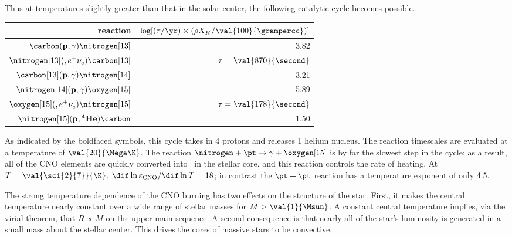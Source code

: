 Thus at temperatures slightly greater than that in the solar center, the following catalytic cycle becomes possible.
\begin{center}
\begin{tabular}{rr}
reaction & $\log[(\tau/\yr) \times (\rho X_{H}/\val{100}{\grampercc})]$\\
\hline
$\carbon(\mathbf{p},\gamma)\nitrogen[13]$ & 3.82\\
$\nitrogen[13](,e^{+}\nu_{e})\carbon[13]$ & $\tau=\val{870}{\second}$\\
$\carbon[13](\mathbf{p},\gamma)\nitrogen[14]$ & 3.21\\
$\nitrogen[14](\mathbf{p},\gamma)\oxygen[15]$ & 5.89 \\
$\oxygen[15](,e^{+}\nu_{e})\nitrogen[15]$ & $\tau = \val{178}{\second}$\\
$\nitrogen[15](\mathbf{p},\mathbf{^4He})\carbon$ & 1.50 \\
\hline
\end{tabular}
\end{center}
As indicated by the boldfaced symbols, this cycle takes in 4 protons and releases 1 helium nucleus.
The reaction timescales are evaluated at a temperature of $\val{20}{\Mega\K}$.
The reaction $\nitrogen+\pt\to\gamma+\oxygen[15]$ is by far the slowest step in the cycle; as a result, all of the CNO elements are quickly converted into \nitrogen\ in the stellar core, and this reaction controls the rate of heating.  At $T = \val{\sci{2}{7}}{\K}$, $\dif \ln \varepsilon_{\mathrm{CNO}}/\dif\ln T = 18$; in contrast the $\pt+\pt$ reaction has a temperature exponent of only 4.5.

The strong temperature dependence of the CNO burning has two effects on the structure of the star.  First, it makes the central temperature nearly constant over a wide range of stellar masses for $M > \val{1}{\Msun}$. A constant central temperature implies, via the virial theorem, that $R \propto M$ on the upper main sequence.  A second consequence is that nearly all of the star's luminosity is generated in a small mass about the stellar center.  This drives the cores of massive stars to be convective.

